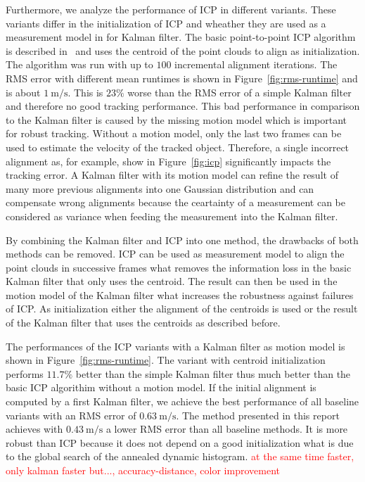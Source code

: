 \documentclass[twoside,a4paper,article]{combine}
\begin{document}
Furthermore, we analyze the performance of ICP in different
variants. These variants differ in the initialization of ICP and
wheather they are used as a measurement model in for Kalman
filter. The basic point-to-point ICP algorithm is described
in~\cite{icp-basic} and uses the centroid of the point clouds to align
as initialization. The algorithm was run with up to $100$ incremental
alignment iterations. The RMS error with different mean runtimes is
shown in Figure~\ref{fig:rms-runtime} and is about
$1\mathrm{~m/s}$. This is $23\%$ worse than the RMS error of a simple
Kalman filter and therefore no good tracking performance. This bad
performance in comparison to the Kalman filter is caused by the
missing motion model which is important for robust tracking. Without a
motion model, only the last two frames can be used to estimate the
velocity of the tracked object. Therefore, a single incorrect
alignment as, for example, show in Figure~\ref{fig:icp} significantly
impacts the tracking error. A Kalman filter with its motion model
can refine the result of many more previous alignments into one
Gaussian distribution and can compensate wrong alignments because the
ceartainty of a measurement can be considered as variance when feeding
the measurement into the Kalman filter. 

By combining the Kalman filter and ICP into one method, the drawbacks
of both methods can be removed. ICP can be used as measurement model
to align the point clouds in successive frames what removes the
information loss in the basic Kalman filter that only uses the
centroid. The result can then be used in the motion model of the
Kalman filter what increases the robustness against failures of
ICP. As initialization either the alignment of the centroids is used
or the result of the Kalman filter that uses the centroids as
described before.

The performances of the ICP variants with a Kalman filter as motion
model is shown in Figure~\ref{fig:rms-runtime}. The variant with
centroid initialization performs $11.7\%$ better than the simple
Kalman filter thus much better than the basic ICP algorithim without a
motion model. If the initial alignment is computed by a first Kalman
filter, we achieve the best performance of all baseline variants with
an RMS error of $0.63\mathrm{~m/s}$. The method presented in this
report achieves with $0.43\mathrm{~m/s}$ a lower RMS error than all
baseline methods. It is more robust than ICP because it does not
depend on a good initialization what is due to the global search of
the annealed dynamic histogram.
\textcolor{red}{at the same time faster, only kalman faster but...,
  accuracy-distance, color improvement}
\end{document}
